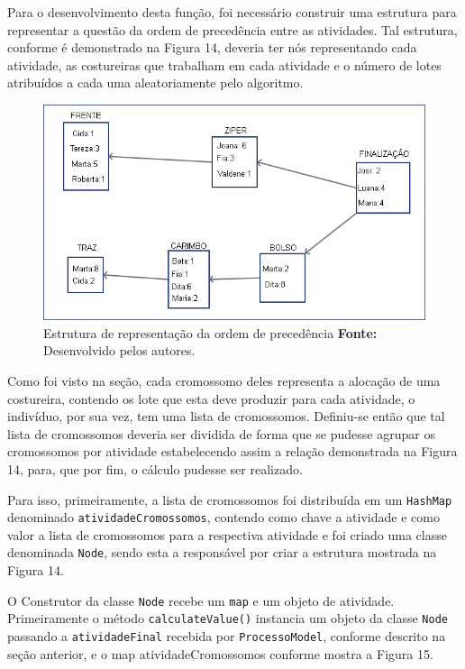 \par Para o desenvolvimento desta função, foi necessário construir uma estrutura para representar a questão da ordem de 
precedência entre as atividades. Tal estrutura, conforme é demonstrado na Figura
14, deveria ter nós representando cada atividade, as costureiras que trabalham em cada atividade e o número de lotes atribuídos a cada uma aleatoriamente pelo algoritmo.

\newpage

\begin{figure}[h!]
	\centerline{\includegraphics[scale=0.6]{./imagens/montagem_node.png}}
	\caption[Distribuição de trabalho]
	{Estrutura de representação da ordem de precedência \textbf{Fonte:}
	Desenvolvido pelos autores.}
	\label{fig:exemplo1}
\end{figure}


\par Como foi visto na seção, cada cromossomo deles representa a alocação de 
uma costureira, contendo os lote que esta deve produzir para cada atividade, o indivíduo, por sua vez, tem uma lista de 
cromossomos. Definiu-se então que tal lista de cromossomos deveria ser dividida
de forma que se pudesse agrupar os cromossomos por atividade estabelecendo assim
a relação demonstrada na Figura 14, para, que por fim, o cálculo pudesse ser
realizado.

\par Para isso, primeiramente, a lista de cromossomos foi distribuída em um \texttt{HashMap} denominado 
\texttt{atividadeCromossomos}, contendo como chave a atividade e como valor a lista de cromossomos para a 
respectiva atividade e foi criado uma classe denominada \texttt{Node}, sendo
esta a responsável por criar a estrutura mostrada na Figura 14.

\par O Construtor da classe \texttt{Node} recebe um \texttt{map} e um objeto de
atividade. Primeiramente o método \texttt{calculateValue()} instancia um objeto da classe \texttt{Node} passando 
a \texttt{atividadeFinal} recebida por \texttt{ProcessoModel}, conforme descrito
na seção anterior, e o map atividadeCromossomos conforme mostra a Figura 15.

